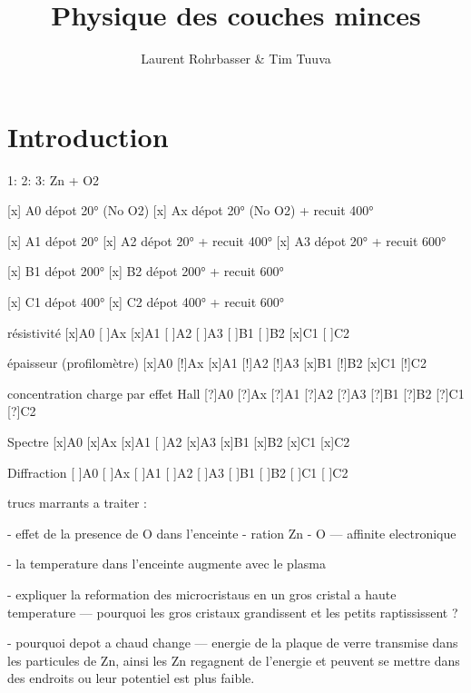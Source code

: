 \documentclass[a4paper,12pt,oneside]{article}
\begin{document}
\title{Physique des couches minces}
\author{Laurent Rohrbasser \& Tim Tuuva}

\maketitle
\tableofcontents
\baselineskip=16pt
\parindent=15pt
\parskip=5pt

\begin{abstract}
\end{abstract}

\section{Introduction}




1:
2:
3: Zn + O2






[x] A0 dépot 20° (No O2)
[x] Ax dépot 20° (No O2) + recuit 400°

[x] A1 dépot 20°
[x] A2 dépot 20° + recuit 400°
[x] A3 dépot 20° + recuit 600°

[x] B1 dépot 200°
[x] B2 dépot 200° + recuit 600°

[x] C1 dépot 400°
[x] C2 dépot 400° + recuit 600°



résistivité
[x]A0
[ ]Ax
[x]A1
[ ]A2
[ ]A3
[ ]B1
[ ]B2
[x]C1
[ ]C2

épaisseur (profilomètre)
[x]A0
[!]Ax
[x]A1
[!]A2
[!]A3
[x]B1
[!]B2
[x]C1
[!]C2

concentration charge par effet Hall
[?]A0
[?]Ax
[?]A1
[?]A2
[?]A3
[?]B1
[?]B2
[?]C1
[?]C2

Spectre
[x]A0
[x]Ax
[x]A1
[ ]A2
[x]A3
[x]B1
[x]B2
[x]C1
[x]C2

Diffraction 
[ ]A0
[ ]Ax
[ ]A1
[ ]A2
[ ]A3
[ ]B1
[ ]B2
[ ]C1
[ ]C2


trucs marrants a traiter :

- effet de la presence de O dans l'enceinte
- ration Zn - O 
--- affinite electronique


- la temperature dans l'enceinte augmente avec le plasma

- expliquer la reformation des microcristaus en un gros cristal a haute temperature
--- pourquoi les gros cristaux grandissent et les petits raptississent ?

- pourquoi depot a chaud change
--- energie de la plaque de verre transmise dans les particules de Zn, ainsi les Zn regagnent de l'energie et peuvent se mettre dans des endroits ou leur potentiel est plus faible.
\end{document}
